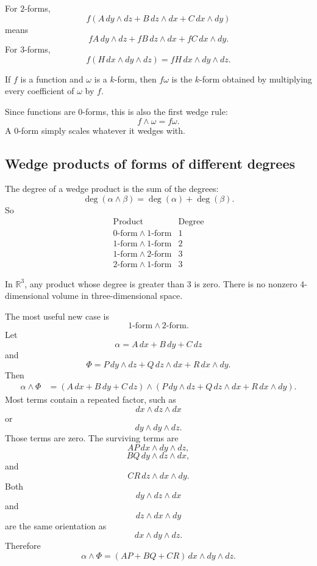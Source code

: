 For \(2\)-forms,
\[
    f\left(A\,dy\wedge dz+B\,dz\wedge dx+C\,dx\wedge dy\right)
\]
means
\[
\boxed{
    fA\,dy\wedge dz+fB\,dz\wedge dx+fC\,dx\wedge dy.
}
\]
For \(3\)-forms,
\[
    f\left(H\,dx\wedge dy\wedge dz\right)
    =
    fH\,dx\wedge dy\wedge dz.
\]

\begin{definition}
If \(f\) is a function and \(\omega\) is a \(k\)-form, then \(f\omega\) is the \(k\)-form
obtained by multiplying every coefficient of \(\omega\) by \(f\).
\end{definition}

Since functions are \(0\)-forms, this is also the first wedge rule:
\[
\boxed{
    f\wedge\omega=f\omega.
}
\]
A \(0\)-form simply scales whatever it wedges with.

\subsection{Wedge products of forms of different degrees}

The degree of a wedge product is the sum of the degrees:
\[
\boxed{
    \deg(\alpha\wedge\beta)=\deg(\alpha)+\deg(\beta).
}
\]
So
\[
\begin{array}{c|c}
\text{Product} & \text{Degree} \\ \hline
0\text{-form}\wedge 1\text{-form} & 1\\[1mm]
1\text{-form}\wedge 1\text{-form} & 2\\[1mm]
1\text{-form}\wedge 2\text{-form} & 3\\[1mm]
2\text{-form}\wedge 1\text{-form} & 3
\end{array}
\]

In \(\mathbb R^3\), any product whose degree is greater than \(3\) is zero.  There is no
nonzero \(4\)-dimensional volume in three-dimensional space.

The most useful new case is
\[
    1\text{-form}\wedge 2\text{-form}.
\]
Let
\[
    \alpha=A\,dx+B\,dy+C\,dz
\]
and
\[
    \Phi=P\,dy\wedge dz+Q\,dz\wedge dx+R\,dx\wedge dy.
\]
Then
\[
\begin{aligned}
    \alpha\wedge\Phi
    &=
    (A\,dx+B\,dy+C\,dz)
    \wedge
    (P\,dy\wedge dz+Q\,dz\wedge dx+R\,dx\wedge dy).
\end{aligned}
\]
Most terms contain a repeated factor, such as
\[
    dx\wedge dz\wedge dx
\]
or
\[
    dy\wedge dy\wedge dz.
\]
Those terms are zero.  The surviving terms are
\[
    AP\,dx\wedge dy\wedge dz,
\]
\[
    BQ\,dy\wedge dz\wedge dx,
\]
and
\[
    CR\,dz\wedge dx\wedge dy.
\]
Both
\[
    dy\wedge dz\wedge dx
\]
and
\[
    dz\wedge dx\wedge dy
\]
are the same orientation as
\[
    dx\wedge dy\wedge dz.
\]
Therefore
\[
\boxed{
    \alpha\wedge\Phi
    =
    (AP+BQ+CR)\,dx\wedge dy\wedge dz.
}
\]

